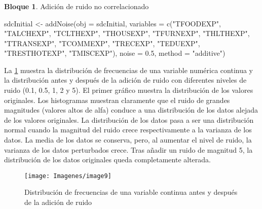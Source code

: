 \documentclass[
]{book}
\newenvironment{Shaded}{\begin{snugshade}}{\end{snugshade}}
\newcommand{\AttributeTok}[1]{\textcolor[rgb]{0.77,0.63,0.00}{#1}}
\newcommand{\FloatTok}[1]{\textcolor[rgb]{0.00,0.00,0.81}{#1}}
\newcommand{\FunctionTok}[1]{\textcolor[rgb]{0.00,0.00,0.00}{#1}}
\newcommand{\NormalTok}[1]{#1}
\newcommand{\OtherTok}[1]{\textcolor[rgb]{0.56,0.35,0.01}{#1}}
\newcommand{\StringTok}[1]{\textcolor[rgb]{0.31,0.60,0.02}{#1}}
\theoremstyle{definition}
\theoremstyle{definition}
\newtheorem{example}{Bloque}[chapter]
\theoremstyle{definition}
\theoremstyle{definition}
\theoremstyle{remark}
\begin{document}
\hypertarget{section-7}{%
\subsubsection{}\label{section-7}}

\begin{example}
\protect\hypertarget{exm:bloque33jgm}{}\label{exm:bloque33jgm}Adición de ruido no correlacionado
\end{example}

\begin{Shaded}
\begin{Highlighting}[]
\NormalTok{sdcInitial }\OtherTok{\textless{}{-}} \FunctionTok{addNoise}\NormalTok{(}\AttributeTok{obj =}\NormalTok{ sdcInitial, }\AttributeTok{variables =} \FunctionTok{c}\NormalTok{(}\StringTok{"TFOODEXP"}\NormalTok{, }\StringTok{"TALCHEXP"}\NormalTok{, }\StringTok{"TCLTHEXP"}\NormalTok{, }\StringTok{"THOUSEXP"}\NormalTok{, }
                                                       \StringTok{"TFURNEXP"}\NormalTok{, }\StringTok{"THLTHEXP"}\NormalTok{, }\StringTok{"TTRANSEXP"}\NormalTok{, }\StringTok{"TCOMMEXP"}\NormalTok{,}
                                                       \StringTok{"TRECEXP"}\NormalTok{, }\StringTok{"TEDUEXP"}\NormalTok{, }\StringTok{"TRESTHOTEXP"}\NormalTok{, }\StringTok{"TMISCEXP"}\NormalTok{), }
                       \AttributeTok{noise =} \FloatTok{0.5}\NormalTok{, }\AttributeTok{method =} \StringTok{"additive"}\NormalTok{)}
\end{Highlighting}
\end{Shaded}

La \ref{fig:fig10} muestra la distribución de frecuencias de una variable numérica continua y la distribución antes y después de la adición de ruido con diferentes niveles de ruido (0.1, 0.5, 1, 2 y 5). El primer gráfico muestra la distribución de los valores originales. Los histogramas muestran claramente que el ruido de grandes magnitudes (valores altos de alfa) conduce a una distribución de los datos alejada de los valores originales. La distribución de los datos pasa a ser una distribución normal cuando la magnitud del ruido crece respectivamente a la varianza de los datos. La media de los datos se conserva, pero, al aumentar el nivel de ruido, la varianza de los datos perturbados crece. Tras añadir un ruido de magnitud 5, la distribución de los datos originales queda completamente alterada.

\begin{figure}
\texttt{[image: Imagenes/image9]} \caption{Distribución de frecuencias de una variable continua antes y después de la adición de ruido}\label{fig:fig10}
\end{figure}
\end{document}
